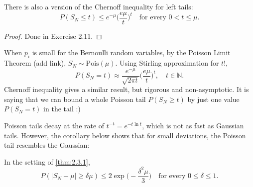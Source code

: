 \begin{remark}
\label{rmk:2.3.2}
There is also a version of the Chernoff inequality for left tails: 
\[ P(S_N \leq t) \leq e^{-\mu} \biggl( \frac{e \mu}{t} \biggr)^t \quad \text{for every } 
0 < t \leq \mu. \]
\end{remark}

\begin{proof}
Done in Exercise 2.11.
\end{proof}

\begin{remark}
\label{rmk:2.3.3}
When $p_i$ is small for the Bernoulli random variables, by the Poisson Limit Theorem (add link), 
$S_N \sim \text{Pois}(\mu)$. Using Stirling approximation for $t!$, 
\[ P(S_N = t) \approx \frac{e^{-\mu}}{\sqrt{2 \pi t}} \biggl( \frac{e \mu}{t} \biggr)^t, 
\quad t \in \mathbb{N}. \]
Chernoff inequality gives a similar result, but rigorous and non-asymptotic. It is saying that we can 
bound a whole Poisson tail $P(S_N \geq t)$ by just one value $P(S_N = t)$ in the tail :)
\end{remark}

Poisson tails decay at the rate of $t^{-t} = e^{-t \ln{t}}$, which is not as fast as Gaussian tails. 
However, the corollary below shows that for small deviations, the Poisson tail resembles the Gaussian: 
\begin{corollary}
In the setting of \cref{thm:2.3.1}, 
\[ P(|S_N - \mu| \geq \delta \mu) \leq 2 \exp{\biggl( -\frac{\delta^2 \mu}{3} \biggr)} \quad 
\text{for every } 0 \leq \delta \leq 1. \]
\end{corollary}

